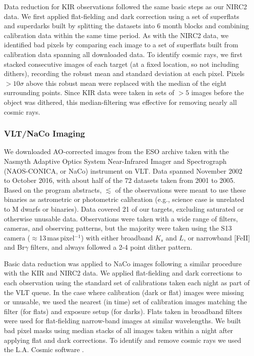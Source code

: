 \documentclass[twocolumn]{aastex62}
\begin{document}
Data reduction for KIR observations followed the same basic steps as our NIRC2 data. We first applied flat-fielding and dark correction using a set of superflats and superdarks built by splitting the datasets into 6 month blocks and combining calibration data within the same time period. As with the NIRC2 data, we identified bad pixels by comparing each image to a set of superflats built from calibration data spanning all downloaded data. To identify cosmic rays, we first stacked consecutive images of each target (at a fixed location, so not including dithers), recording the robust mean and standard deviation at each pixel. Pixels $>10\sigma$ above this robust mean were replaced with the median of the eight surrounding points. Since KIR data were taken in sets of $>5$ images before the object was dithered, this median-filtering was effective for removing nearly all cosmic rays.


\subsubsection{VLT/NaCo Imaging}

We downloaded AO-corrected images from the ESO archive taken with the Nasmyth Adaptive Optics System Near-Infrared Imager and Spectrograph (NAOS-CONICA, or NaCo) instrument on VLT. Data spanned November 2002 to October 2016, with about half of the 72 datasets taken from 2001 to 2005. Based on the program abstracts, $\lesssim$ of the observations were meant to use these binaries as astrometric or photometric calibration (e.g., science case is unrelated to M dwarfs or binaries). Data covered 21 of our targets, excluding saturated or otherwise unusable data. Observations were taken with a wide range of filters, cameras, and observing patterns, but the majority were taken using the S13 camera ($\approx$13\,mas\,pixel$^{-1}$) with either broadband $K_s$ and $L$, or narrowband [FeII] and Br$\gamma$ filters, and always followed a 2-4 point dither pattern. 

Basic data reduction was applied to NaCo images following a similar procedure with the KIR and NIRC2 data. We applied flat-fielding and dark corrections to each observation using the standard set of calibrations taken each night as part of the VLT queue. In the case where calibration (dark or flat) images were missing or unusable, we used the nearest (in time) set of calibration images matching the filter (for flats) and exposure setup (for darks). Flats taken in broadband filters were used for flat-fielding narrow-band images at similar wavelengths. We built bad pixel masks using median stacks of all images taken within a night after applying flat and dark corrections. To identify and remove cosmic rays we used the L.A. Cosmic software \citep{2001PASP..113.1420V}.
\end{document}
